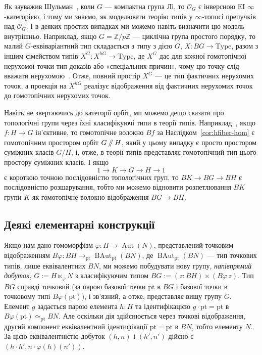 \documentclass[12pt]{article}
\newcommand*{\concat}{\cdot}
\newcommand*{\bZ}{{\mathbb{Z}}}
\newcommand*{\pt}{{\mathrm{pt}}}
\newcommand*{\dblslash}{\mathbin{/\kern-3pt/}}
\renewcommand*{\equiv}{\mathrel{\simeq}}
\DeclareMathOperator\Aut{Aut}
\DeclareMathOperator\BAut{BAut}
\newcommand*{\Type}{\mathrm{Type}}
\begin{document}
Як зауважив Шульман~\cite{ShulmanEI}, коли $G$ — компактна група Лі, то $\mathcal{O}_G$ є інверсною EI $\infty$-категорією, і тому ми знаємо, як моделювати теорію типів у $\infty$-топосі препучків над $\mathcal{O}_G$. І в деяких простих випадках ми можемо навіть визначити цю модель внутрішньо. Наприклад, якщо $G = \bZ/p\bZ$ — циклічна група простого порядку, то малий $G$-еквіваріантний тип складається з типу з дією $G$, $X : BG \to \Type$, разом з іншим сімейством типів $X^G : X^{hG} \to \Type$, де $X^G$ дає для кожної гомотопічної нерухомої точки тип доказів або «спеціальних причин», чому цю точку слід вважати нерухомою~\cite[7.6]{ShulmanEI}. Отже, повний простір $X^G$ — це тип фактичних нерухомих точок, а проекція на $X^{hG}$ реалізує відображення від фактичних нерухомих точок до гомотопічних нерухомих точок.

Навіть не звертаючись до категорії орбіт, ми можемо дещо сказати про топологічні групи через їхні класифікуючі типи в теорії типів. Наприклад~\cite{Camarena}, якщо $f : H \to G$ ін'єктивне, то гомотопічне волокно $Bf$ за Наслідком~\ref{cor:hfiber-hom} є гомотопічним простором орбіт $G \dblslash H$, який у цьому випадку є просто простором суміжних класів $G/H$, і, отже, в теорії типів представляє гомотопічний тип цього простору суміжних класів. І якщо
\[
  1 \to K \to G \to H \to 1
\]
є короткою точною послідовністю топологічних груп, то $BK \to BG \to BH$ є послідовністю розшарування, тобто ми можемо відновити розпетлювання $BK$ групи $K$ як гомотопічне волокно відображення $BG \to BH$.

\subsection{Деякі елементарні конструкції}
\label{sec:elementary-constructions}

Якщо нам дано гомоморфізм $\varphi : H \to \Aut(N)$, представлений точковим відображенням $B\varphi : BH \to_\pt \BAut_\pt(BN)$, де $\BAut_\pt(BN)$ — тип точкових типів, лише еквівалентних $BN$, ми можемо побудувати нову групу, \emph{напівпрямий добуток}, $G := H \ltimes_\varphi N$ з класифікуючим типом $BG := (z : BH) \times (B\varphi\,z)$. Тип $BG$ справді точковий (за парою базової точки $\pt$ в $BG$ і базової точки в точковому типі $B\varphi(\pt)$), і зв'язний, а отже, представляє вищу групу $G$. Елемент $g$ задається парою елемента $h : H$ та ідентифікацією $g \concat \pt = \pt$ в $B\varphi(\pt) \equiv_\pt BN$. Але оскільки дія здійснюється через точкові відображення, другий компонент еквівалентний ідентифікації $\pt = \pt$ в $BN$, тобто елементу $N$. За цією еквівалентністю добуток $(h,n)$ і $(h',n')$ дійсно є $(h \concat h', n \concat \varphi(h)(n'))$.
\end{document}
